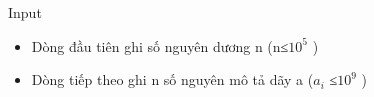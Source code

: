 Input
\begin{itemize}
	\item     Dòng đầu tiên ghi số nguyên dương n (n≤$10^{5}$    )   
	\item     Dòng  tiếp theo ghi n số nguyên mô tả dãy a ($a_{i}$    ≤$10^{9}$    )   
\end{itemize}
